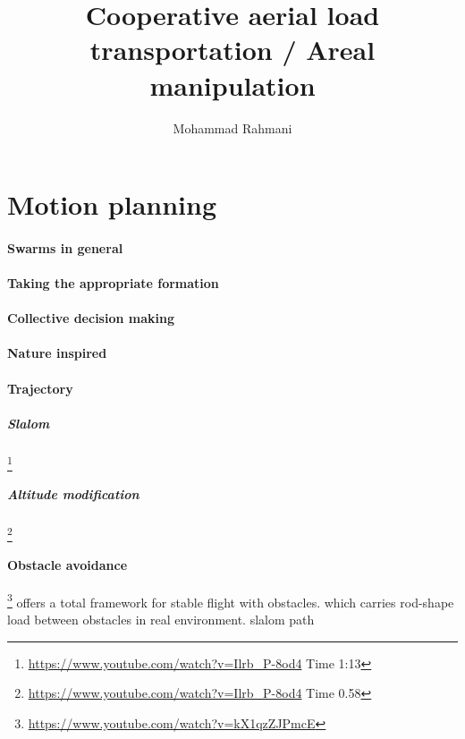 \documentclass{article}
\begin{document}
	
	\title{Cooperative aerial load transportation / Areal manipulation}
	\author{Mohammad Rahmani}
	\date{}
	\maketitle
	\section{Motion planning}
		\paragraph{Swarms in general}
			\cite{medina-2018-robotic-swarm-motion-planning-for-load-carrying-and-manipulating}
		\paragraph{Taking the appropriate formation}
			\cite{vasarhelyi-2014-outdoor-flocking-and-formation-flight-with-autonomous-aerial-robots}
			\cite{soria-2020-swarmlab-a-matlab-drone-swarm-simulator}
		\paragraph {Collective decision making}
			\cite{han-2010-collective-decision-making-in-multi-agent-systems-by-implicit-leadership}
		\paragraph {Nature inspired}
			\cite{gelblum-2017-ant-groups-optimally-amplify-the-effect-of-transiently-informed-individuals}
		\paragraph{Trajectory}
			\subparagraph{Slalom}
			\cite{loianno-2017-cooperative-transportation-using-small-quadrotors-using-monocular-vision-and-inertial-sensing}\footnote{\url{https://www.youtube.com/watch?v=Ilrb_P-8od4} Time 1:13}
			\subparagraph{Altitude modification}
			\cite{loianno-2017-cooperative-transportation-using-small-quadrotors-using-monocular-vision-and-inertial-sensing}\footnote{\url{https://www.youtube.com/watch?v=Ilrb_P-8od4} Time 0.58}
		\paragraph{Obstacle avoidance}
			\cite{lee-2018-an-integrated-framework-for-cooperative-aerial-manipulators-in-unknown-environments}\footnote{\url{https://www.youtube.com/watch?v=kX1qzZJPmcE}} offers a total framework for stable flight with obstacles.
			\cite{spurny-2019-cooperative-transport-of-large-objects-by-a-pair-of-unmanned-aerial-systems-using-sampling-based-motion-planning} which carries rod-shape load between obstacles in real environment.
			\cite{loianno-2017-cooperative-transportation-using-small-quadrotors-using-monocular-vision-and-inertial-sensing}
			slalom path
\end{document}
